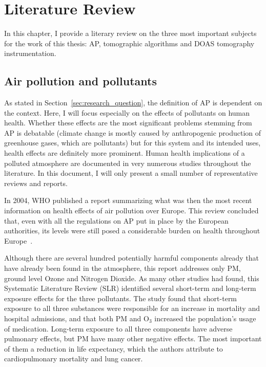 \chapter{Literature Review}
\label{cha:literature_review}

In this chapter, I provide a literary review on the three most important
subjects for the work of this thesis: \gls{AP}, tomographic algorithms
and \gls{DOAS} tomography instrumentation.

\section{Air pollution and pollutants}%
\label{sec:air_pollution_and_pollutants}

As stated in Section~\ref{sec:research_question}, the definition of
\gls{AP} is dependent on the context. Here, I will focus especially on
the effects of pollutants on human health. Whether these effects are the
most significant problems stemming from \gls{AP} is debatable (climate
change is mostly caused by anthropogenic production of greenhouse gases,
which are pollutants) but for this system and its intended uses, health
effects are definitely more prominent. Human health implications of a
polluted atmosphere are documented in very numerous studies throughout
the literature. In this document, I will only present a small number of
representative reviews and reports.

In 2004, \gls{WHO} published a report summarizing what was then the most
recent information on health effects of air pollution over Europe. This
review concluded that, even with all the regulations on \gls{AP} put in
place by the European authorities, its levels were still posed a
considerable burden on health throughout
Europe~\cite{WorldHealthOrganisationEurope2004}.

Although there are several hundred potentially harmful components
already that have already been found in the atmosphere, this report
addresses only \gls{PM}, ground level Ozone and Nitrogen Dioxide. As
many other studies had found, this Systematic Literature Review
(\gls{SLR}) identified several short-term and long-term exposure effects
for the three pollutants. The study found that short-term exposure to
all three substances were responsible for an increase in mortality and
hospital admissions, and that both \gls{PM} and O$_3$ increased the
population's usage of medication. Long-term exposure to all three
components have adverse pulmonary effects, but \gls{PM} have many other
negative effects. The most important of them a reduction in life
expectancy, which the authors attribute to cardiopulmonary mortality and
lung cancer.






